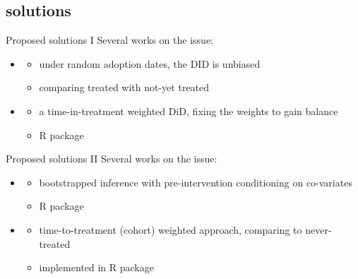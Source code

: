 \documentclass[aspectratio=169]{beamer}
\begin{document}
	\subsection{solutions}
		\begin{frame}{Proposed solutions I}
			Several works on the issue:
			\\ \vspace*{.25cm}
			\begin{itemize}
				\item<2-> \cite{Athey2020}
					\begin{itemize}
						\item under random adoption dates, the DID is unbiased
						\item comparing treated with not-yet treated
					\end{itemize}
				\item<3-> \cite{Goodman-Bacon2018}
					\begin{itemize}
						\item a time-in-treatment weighted DiD, fixing the weights to gain balance
						\item R package \href{https://cran.r-project.org/web/packages/bacondecomp/index.html}{\underline{}}
					\end{itemize}
			\end{itemize}
		\end{frame}

		\begin{frame}{Proposed solutions II}
			Several works on the issue:
			\\ \vspace*{.25cm}
			\begin{itemize}
				\item<2-> \cite{Callaway2020}
					\begin{itemize}
						\item bootstrapped inference with pre-intervention conditioning on co-variates
						\item R package \href{https://cran.r-project.org/web/packages/did/vignettes/did-basics.html}{\underline{}}
					\end{itemize}
				\item<3-> \cite{Sun2020a}
					\begin{itemize}
						\item time-to-treatment (cohort) weighted approach, comparing to never-treated
						\item implemented in \href{https://cran.r-project.org/web/packages/fixest/vignettes/fixest_walkthrough.html}{\underline{}} R package
					\end{itemize}
			\end{itemize}
		\end{frame}
\end{document}
